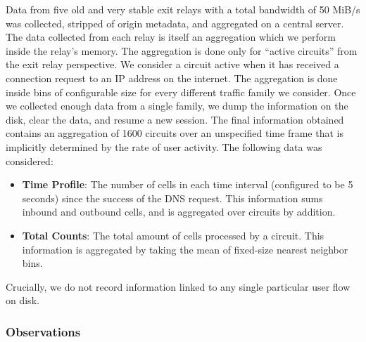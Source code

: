 Data from five old and very stable exit relays with a total bandwidth of 50 MiB/s was collected, stripped of
origin metadata, and aggregated on a central server. The data collected from each
relay is itself an aggregation which we perform inside the relay's memory. The aggregation is done only for ``active circuits'' from the exit relay perspective. We consider a circuit active when it has received a connection request to an IP address on the internet.
The aggregation is done inside bins of configurable size for
every different traffic family we consider. Once we collected enough data from a
single family, we dump the information on the disk, clear the data, and resume a
new session. The final information obtained contains an aggregation of 1600
circuits over an unspecified time frame that is implicitly determined by the
rate of user activity. The following data was considered:

\begin{itemize}
\item \textbf{Time Profile}: The number of cells in each time interval
  (configured to be 5 seconds) since the success of the DNS request. This
  information sums inbound and outbound cells, and is aggregated over circuits
  by addition.
\item \textbf{Total Counts}: The total amount of cells processed by a
  circuit. This information is aggregated by taking the mean of fixed-size
  nearest neighbor bins.
\end{itemize}

Crucially, we do not record information linked to any single particular user
flow on disk.

\subsubsection{Observations}

